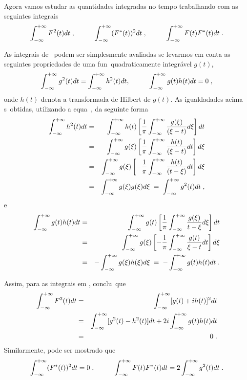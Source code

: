 Agora vamos estudar as quantidades integradas no
tempo trabalhando com as seguintes integrais
\begin{eqnarray} \label{integs}
\int_{-\infty}^{+\infty} F^2(t) dt \; , \hspace{1cm}
\int_{-\infty}^{+\infty} (F^{*}(t))^2 dt \; , \hspace{1cm}
\int_{-\infty}^{+\infty} F(t)F^{*}(t) dt \; .
\end{eqnarray}

As integrais de \ podem ser
simplesmente avaliadas se levarmos em conta as
seguintes propriedades de uma fun\cao\
quadraticamente integr\'avel $g(t)$,
\begin{eqnarray}
\int_{-\infty}^{+\infty} g^2(t) dt = \int_{-\infty}^{+\infty} h^2(t) dt, \hspace{1cm}
\int_{-\infty}^{+\infty} g(t) h(t) dt = 0 \; ,
\end{eqnarray}
onde $h(t)$ denota a transformada de Hilbert de
$g(t)$. As igualdadades acima s\ao\ obtidas, utilizando
a equa\cao\ , da seguinte forma
\begin{eqnarray}
\int_{-\infty}^{+\infty} h^2(t) dt &=& \int_{-\infty}^{+\infty} h(t) \left[\frac{1}{\pi} \int_{-\infty}^{+\infty} 
\frac{g(\xi)}{(\xi-t)} d\xi \right] dt \nonumber \\
&=& \int_{-\infty}^{+\infty} g(\xi) \left[
\frac{1}{\pi} \int_{-\infty}^{+\infty} \frac{h(t)}{(\xi-t)} dt
\right] d\xi \nonumber \\
&=& \int_{-\infty}^{+\infty} g(\xi) \left[-\frac{1}{\pi} \int_{-\infty}^{+\infty}
\frac{h(t)}{(t-\xi)} dt \right] d\xi \nonumber \\
&=& \int_{-\infty}^{+\infty} g(\xi)g(\xi) d\xi \; = \; \int_{-\infty}^{+\infty} g^2(t) dt \; ,
\end{eqnarray}
e
\begin{eqnarray}
\int_{-\infty}^{+\infty} g(t) h(t) dt &=& \int_{-\infty}^{+\infty} g(t) \left[ \frac{1}{\pi}
\int_{-\infty}^{+\infty} \frac{g(\xi)}{t-\xi} d\xi \right] dt \nonumber \\
& = &
\int_{-\infty}^{+\infty} g(\xi) \left[-\frac{1}{\pi}
\int_{-\infty}^{+\infty} \frac{g(t)}{\xi-t} dt \right] d\xi \nonumber \\
&=& -\int_{-\infty}^{+\infty} g(\xi) h(\xi) d\xi 
\; = \; - \int_{-\infty}^{+\infty} g(t) h(t) dt \; .
\end{eqnarray}

Assim, para as integrais em , conclu\imos\ que
\begin{eqnarray}
\int_{-\infty}^{+\infty} F^2(t) dt 
& = &\int_{-\infty}^{+\infty}[g(t) + ih(t)]^2 dt \nonumber \\
& = &
\int_{-\infty}^{+\infty} [g^2(t)-h^2(t)]dt + 2i\int_{-\infty}^{+\infty} g(t)h(t) dt \nonumber \\
& = &0 \; .
\end{eqnarray}
Similarmente, pode ser mostrado que
\begin{eqnarray}
\int_{-\infty}^{+\infty} (F^{*}(t))^2 dt = 0 \; , \hspace{1cm}
\int_{-\infty}^{+\infty} F(t)F^{*}(t) dt = 2 \int_{-\infty}^{+\infty} g^2(t) dt \; .
\end{eqnarray}

